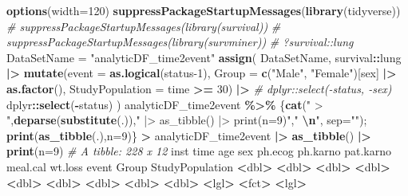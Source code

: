 \documentclass[
]{article}
\newenvironment{Shaded}{\begin{snugshade}}{\end{snugshade}}
\newcommand{\AttributeTok}[1]{\textcolor[rgb]{0.13,0.29,0.53}{#1}}
\newcommand{\CommentTok}[1]{\textcolor[rgb]{0.56,0.35,0.01}{\textit{#1}}}
\newcommand{\DecValTok}[1]{\textcolor[rgb]{0.00,0.00,0.81}{#1}}
\newcommand{\ErrorTok}[1]{\textcolor[rgb]{0.64,0.00,0.00}{\textbf{#1}}}
\newcommand{\FunctionTok}[1]{\textcolor[rgb]{0.13,0.29,0.53}{\textbf{#1}}}
\newcommand{\NormalTok}[1]{#1}
\newcommand{\OtherTok}[1]{\textcolor[rgb]{0.56,0.35,0.01}{#1}}
\newcommand{\SpecialCharTok}[1]{\textcolor[rgb]{0.81,0.36,0.00}{\textbf{#1}}}
\newcommand{\StringTok}[1]{\textcolor[rgb]{0.31,0.60,0.02}{#1}}
\begin{document}
\begin{Shaded}
\begin{Highlighting}[]
\FunctionTok{options}\NormalTok{(}\AttributeTok{width=}\DecValTok{120}\NormalTok{)}
\FunctionTok{suppressPackageStartupMessages}\NormalTok{(}\FunctionTok{library}\NormalTok{(tidyverse))}
\CommentTok{\# suppressPackageStartupMessages(library(survival))}
\CommentTok{\# suppressPackageStartupMessages(library(survminer))}
\CommentTok{\# ?survival::lung}
\NormalTok{DataSetName }\OtherTok{=} \StringTok{"analyticDF\_time2event"}
\FunctionTok{assign}\NormalTok{(}
\NormalTok{    DataSetName, }
\NormalTok{    survival}\SpecialCharTok{::}\NormalTok{lung }\SpecialCharTok{|\textgreater{}} \FunctionTok{mutate}\NormalTok{(}\AttributeTok{event =} \FunctionTok{as.logical}\NormalTok{(status}\DecValTok{{-}1}\NormalTok{), }\AttributeTok{Group =} \FunctionTok{c}\NormalTok{(}\StringTok{"Male"}\NormalTok{, }\StringTok{"Female"}\NormalTok{)[sex] }\SpecialCharTok{|\textgreater{}} \FunctionTok{as.factor}\NormalTok{(), }\AttributeTok{StudyPopulation =}\NormalTok{ time }\SpecialCharTok{\textgreater{}=} \DecValTok{30}\NormalTok{) }\SpecialCharTok{|\textgreater{}}
        \CommentTok{\# dplyr::select({-}status, {-}sex)}
\NormalTok{        dplyr}\SpecialCharTok{::}\FunctionTok{select}\NormalTok{(}\SpecialCharTok{{-}}\NormalTok{status)}
\NormalTok{)}
\NormalTok{analyticDF\_time2event }\SpecialCharTok{\%\textgreater{}\%}\NormalTok{ \{}\FunctionTok{cat}\NormalTok{(}\StringTok{" \textgreater{} "}\NormalTok{,}\FunctionTok{deparse}\NormalTok{(}\FunctionTok{substitute}\NormalTok{(.)),}\StringTok{" |\textgreater{} as\_tibble() |\textgreater{} print(n=9)"}\NormalTok{,}\StringTok{"  }\SpecialCharTok{\textbackslash{}n}\StringTok{"}\NormalTok{, }\AttributeTok{sep=}\StringTok{""}\NormalTok{); }\FunctionTok{print}\NormalTok{(}\FunctionTok{as\_tibble}\NormalTok{(.),}\AttributeTok{n=}\DecValTok{9}\NormalTok{)\}}
 \SpecialCharTok{\textgreater{}}\NormalTok{ analyticDF\_time2event }\SpecialCharTok{|\textgreater{}} \FunctionTok{as\_tibble}\NormalTok{() }\SpecialCharTok{|\textgreater{}} \FunctionTok{print}\NormalTok{(}\AttributeTok{n=}\DecValTok{9}\NormalTok{)  }
\CommentTok{\# A tibble: 228 x 12}
\NormalTok{   inst  time   age   sex ph.ecog ph.karno pat.karno meal.cal wt.loss event Group  StudyPopulation}
  \SpecialCharTok{\textless{}}\NormalTok{dbl}\SpecialCharTok{\textgreater{}} \ErrorTok{\textless{}}\NormalTok{dbl}\SpecialCharTok{\textgreater{}} \ErrorTok{\textless{}}\NormalTok{dbl}\SpecialCharTok{\textgreater{}} \ErrorTok{\textless{}}\NormalTok{dbl}\SpecialCharTok{\textgreater{}}   \ErrorTok{\textless{}}\NormalTok{dbl}\SpecialCharTok{\textgreater{}}    \ErrorTok{\textless{}}\NormalTok{dbl}\SpecialCharTok{\textgreater{}}     \ErrorTok{\textless{}}\NormalTok{dbl}\SpecialCharTok{\textgreater{}}    \ErrorTok{\textless{}}\NormalTok{dbl}\SpecialCharTok{\textgreater{}}   \ErrorTok{\textless{}}\NormalTok{dbl}\SpecialCharTok{\textgreater{}} \ErrorTok{\textless{}}\NormalTok{lgl}\SpecialCharTok{\textgreater{}} \ErrorTok{\textless{}}\NormalTok{fct}\SpecialCharTok{\textgreater{}}  \ErrorTok{\textless{}}\NormalTok{lgl}\SpecialCharTok{\textgreater{}}          

\end{Highlighting}
\end{Shaded}
\end{document}
